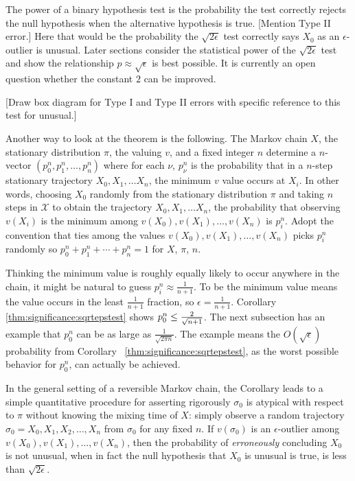 \documentclass[12pt]{article}
\begin{document}
\begin{remark}
    The power%
    of a binary hypothesis test is the probability the test correctly
    rejects the null hypothesis when the alternative hypothesis is
    true. [Mention Type II error.]
    Here that would be the probability the \( \sqrt{2\epsilon} \) test
    correctly says \( X_0 \) as an \( \epsilon \)-outlier is unusual.
    Later sections consider the
    statistical power of the \( \sqrt{2\epsilon} \) test and show the
    relationship \( p \approx \sqrt{\epsilon} \) is best possible.  It
    is currently an open question whether the constant \( 2 \) can be
    improved.
\end{remark}

[Draw box diagram for Type I and Type II errors with specific reference
to this test for unusual.]


Another way to look at the theorem is the following.  The Markov chain \(
X \), the stationary distribution \( \pi \), the valuing \( v \),
and a fixed integer \( n \) determine a \( n \)-vector \( (p_0^n, p_1^n,
\dots, p_n^n) \) where for each \( \nu \), \( p_{\nu}^n \) is the
probability that in a \( n \)-step stationary trajectory \( X_0, X_1,
\dots X_n \), the minimum \( v \) value occurs at \( X_i \).  In other
words, choosing \( X_0 \) randomly from the stationary distribution \(
\pi \) and taking \( n \) steps in \( \mathcal{X} \) to obtain the
trajectory \( X_0, X_1, \dots X_n \), the probability that observing \(
v(X_i) \) is the minimum among \( v(X_0), v(X_1), \dots, v(X_n) \) is \(
p_i^n \).  Adopt the convention that ties among the values \( v (X_0), v
(X_1), \dots, v(X_n) \) picks \( p_i^n \) randomly so \( p_0^n + p_1^n +
\cdots + p_n^n = 1 \) for \( X \), \( \pi \), \( n \).

Thinking the minimum value is roughly equally likely to occur anywhere
in the chain, it might be natural to guess \( p_i^n \approx \frac{1}{n+1}
\).  To be the minimum value means the value occurs in the least \(
\frac{1}{n+1} \) fraction, so \( \epsilon = \frac {1}{n+1} \).
Corollary~%
\ref{thm:significance:sqrtepstest} shows \( p_0^n \le \frac{2}{\sqrt {%
n+1}} \).  The next subsection has an example that \( p_0^n \) can be as
large as \( \frac{1}{\sqrt{2\pi n}} \).  The example means the \( O (\sqrt
{\epsilon}) \) probability from Corollary~%
\ref{thm:significance:sqrtepstest}, as the worst possible behavior for \(
p_0^n \), can actually be achieved.

In the general setting of a reversible Markov chain, the Corollary leads
to a simple quantitative procedure for asserting rigorously \( \sigma_0 \)
is atypical with respect to \( \pi \) without knowing the mixing time of
\( X \):  simply observe a random trajectory \( \sigma_0 = X_0 , X_1, X_2,
\dots, X_n \) from \( \sigma_0 \) for any fixed \( n \). If \( v(\sigma_0
) \) is an \( \epsilon \)-outlier among \( v(X_0), v(X_1), \dots, v(X_n)
\), then the probability of \emph{erroneously} concluding \( X_0 \) is
not unusual, when in fact the null
hypothesis that \( X_0 \) is unusual is
true, is less than \( \sqrt{2 \epsilon } \).
\end{document}
